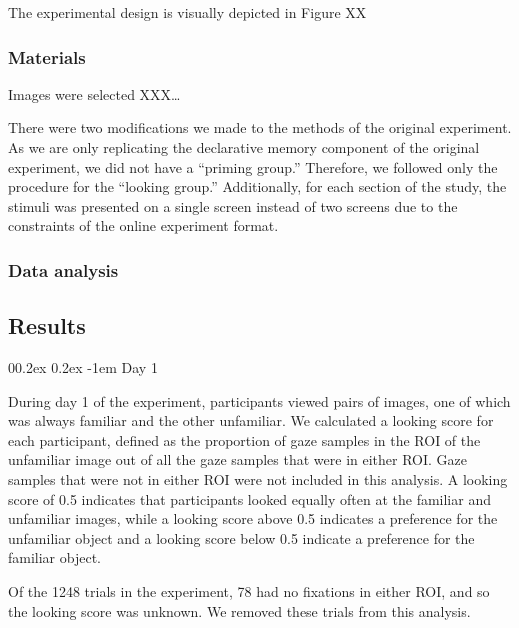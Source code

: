 \documentclass[
  man,floatsintext]{apa6}
\makeatletter
\let\oldparagraph\paragraph
\renewcommand{\paragraph}[1]{\oldparagraph{#1}\mbox{}}
\renewcommand{\paragraph}{\@startsection{paragraph}{4}{\parindent}%
  {0\baselineskip \@plus 0.2ex \@minus 0.2ex}%
  {-1em}%
  {\normalfont\normalsize\bfseries\itshape\typesectitle}}
\makeatother
\begin{document}
The experimental design is visually depicted in Figure XX

\hypertarget{materials}{%
\subsubsection{Materials}\label{materials}}

Images were selected XXX\ldots{}

There were two modifications we made to the methods of the original
experiment. As we are only replicating the declarative memory component
of the original experiment, we did not have a ``priming group.''
Therefore, we followed only the procedure for the ``looking group.''
Additionally, for each section of the study, the stimuli was presented
on a single screen instead of two screens due to the constraints of the
online experiment format.

\hypertarget{data-analysis-1}{%
\subsubsection{Data analysis}\label{data-analysis-1}}

\hypertarget{results-2}{%
\subsection{Results}\label{results-2}}

\hypertarget{day-1}{%
\paragraph{Day 1}\label{day-1}}

During day 1 of the experiment, participants viewed pairs of images, one of which was always familiar and the other unfamiliar. We calculated a looking score for each participant, defined as the proportion of gaze samples in the ROI of the unfamiliar image out of all the gaze samples that were in either ROI. Gaze samples that were not in either ROI were not included in this analysis. A looking score of 0.5 indicates that participants looked equally often at the familiar and unfamiliar images, while a looking score above 0.5 indicates a preference for the unfamiliar object and a looking score below 0.5 indicate a preference for the familiar object.

Of the 1248 trials in the experiment, 78 had no fixations in either ROI, and so the looking score was unknown. We removed these trials from this analysis.
\end{document}
